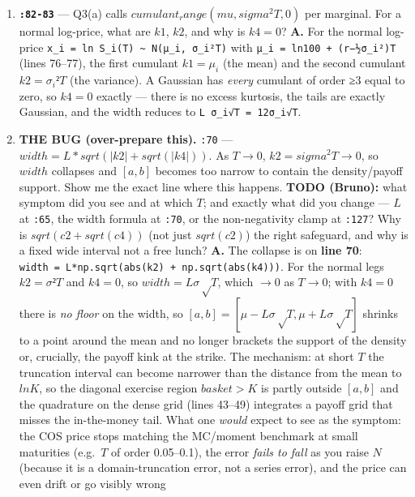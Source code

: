 \documentclass[
  11pt,
]{article}
\begin{document}
\begin{enumerate}
  safety multiplier from Fang--Oosterlee; larger \(L\) means a wider,
  safer truncation at the cost of needing more terms \(N\) for the same
  resolution.
\item
  \textbf{\texttt{:82-83}} --- Q3(a) calls
  \(cumulant_range(mu, sigma^2 T, 0)\) per marginal. For a normal
  log-price, what are \(k1\), \(k2\), and why is \(k4 = 0\)? \textbf{A.}
  For the normal log-price
  \texttt{x\_i\ =\ ln\ S\_i(T)\ \textasciitilde{}\ N(μ\_i,\ σ\_i²T)}
  with \texttt{μ\_i\ =\ ln100\ +\ (r−½σ\_i²)T} (lines 76--77), the first
  cumulant \(k1 = μ_i\) (the mean) and the second cumulant
  \(k2 = σ_i²T\) (the variance). A Gaussian has \emph{every} cumulant of
  order ≥3 equal to zero, so \(k4 = 0\) exactly --- there is no excess
  kurtosis, the tails are exactly Gaussian, and the width reduces to
  \texttt{L\ σ\_i√T\ =\ 12σ\_i√T}.
\item
  \textbf{THE BUG (over-prepare this).} \texttt{:70} ---
  \(width = L*sqrt(|k2| + sqrt(|k4|))\). As \(T→0\),
  \(k2 = sigma^2 T → 0\), so \(width\) collapses and \([a,b]\) becomes
  too narrow to contain the density/payoff support. Show me the exact
  line where this happens. \textbf{TODO (Bruno):} what symptom did you
  see and at which \(T\); and exactly what did you change --- \(L\) at
  \texttt{:65}, the width formula at \texttt{:70}, or the non-negativity
  clamp at \texttt{:127}? Why is \(sqrt(c2 + sqrt(c4))\) (not just
  \(sqrt(c2)\)) the right safeguard, and why is a fixed wide interval
  not a free lunch? \textbf{A.} The collapse is on \textbf{line 70}:
  \texttt{width\ =\ L*np.sqrt(abs(k2)\ +\ np.sqrt(abs(k4)))}. For the
  normal legs \(k2 = σ²T\) and \(k4 = 0\), so \(width = Lσ√T\), which
  \(→ 0\) as \(T→0\); with \(k4=0\) there is \emph{no floor} on the
  width, so \([a,b] = [μ − Lσ√T, μ + Lσ√T]\) shrinks to a point around
  the mean and no longer brackets the support of the density or,
  crucially, the payoff kink at the strike. The mechanism: at short
  \(T\) the truncation interval can become narrower than the distance
  from the mean to \(ln K\), so the diagonal exercise region
  \({basket > K}\) is partly outside \([a,b]\) and the quadrature on the
  dense grid (lines 43--49) integrates a payoff grid that misses the
  in-the-money tail. What one \emph{would} expect to see as the symptom:
  the COS price stops matching the MC/moment benchmark at small
  maturities (e.g.~\(T\) of order 0.05--0.1), the error \emph{fails to
  fall} as you raise \(N\) (because it is a domain-truncation error, not
  a series error), and the price can even drift or go visibly wrong

\end{enumerate}
\end{document}
